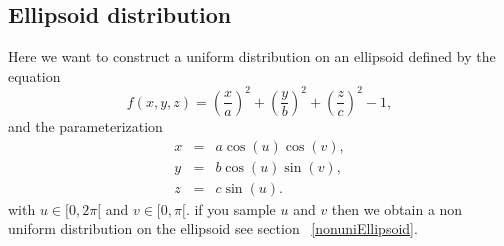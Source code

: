 \documentclass[10pt]{article}
\begin{document}
\subsection{Ellipsoid distribution}
Here we want to construct a uniform distribution on an ellipsoid defined by the equation
\begin{equation}
f(x,y,z) = (\frac{x}{a})^2+(\frac{y}{b})^2+(\frac{z}{c})^2-1,
\end{equation}
and the parameterization 
\begin{eqnarray*}
x	&=&	a\cos(u)\cos(v),\\
y	&=&	b\cos(u)\sin(v), \\
z  &=&	c\sin(u).
\end{eqnarray*}
with $u\in [0, 2\pi[$ and  $v\in [0, \pi[$. if you sample $u$ and $v$ then we obtain a non uniform distribution on the ellipsoid see section~ \ref{nonuniEllipsoid}.
\end{document}
